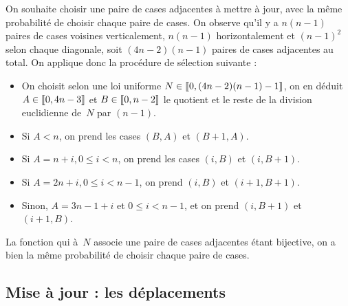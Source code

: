 On souhaite choisir une paire de cases adjacentes à mettre à jour, avec la même probabilité de choisir chaque paire de cases. On observe qu'il y a $n(n-1)$ paires de cases voisines verticalement, $n(n-1)$ horizontalement et $(n-1)^2$ selon chaque diagonale, soit $(4n-2)(n-1)$ paires de cases adjacentes au total. On applique donc la procédure de sélection suivante : \begin{itemize}

\item{On choisit selon une loi uniforme $N \in [\kern-0.15em [ 0, (4n-2)(n-1) -1 ]\kern-0.15em]$, on en déduit $A \in [\kern-0.15em [ 0, 4n-3 ]\kern-0.15em]$ et $B \in [\kern-0.15em [ 0, n-2]\kern-0.15em]$ le quotient et le reste de la division euclidienne de~$N$ par $(n-1)$.  }
\item{Si $A<n$, on prend les cases $(B,A)$ et $(B+1,A)$.}
\item{Si $A = n+i, 0\leq i<n$, on prend les cases $(i,B)$ et $(i,B+1)$.}
\item{Si $A = 2n+i,0 \leq i<n-1$, on prend $(i,B)$ et $(i+1, B+1)$.}
\item{Sinon, $A = 3n-1+i$ et $0 \leq i<n-1$, et on prend $(i, B+1)$ et $(i+1, B)$.}



\end{itemize}
La fonction qui à~$N$ associe une paire de cases adjacentes étant bijective, on a bien la même probabilité de choisir chaque paire de cases. 


\subsection{Mise à jour : les déplacements}


